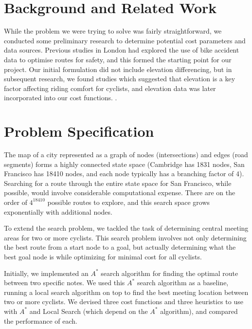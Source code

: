 \documentclass[11pt]{article}
\begin{document}


\section{Background and Related Work}

While the problem we were trying to solve was fairly straightforward, we conducted some preliminary research to determine potential cost parameters and data sources. Previous studies in London had explored the use of bike accident data to optimise routes for safety, and this formed the starting point for our project. Our initial formulation did not include elevation differencing, but in subsequent research, we found studies which suggested that elevation is a key factor affecting riding comfort for cyclists, and elevation data was later incorporated into our cost functions.   \cite{pmbr}.

\section{Problem Specification}
The map of a city represented as a graph of nodes (intersections) and edges (road segments) forms a highly connected state space (Cambridge has 1831 nodes, San Francisco has 18410 nodes, and each node typically has a branching factor of 4). Searching for a route through the entire state space for San Francisco, while possible, would involve considerable computational expense. There are on the order of $4^{18410}$ possible routes to explore, and this search space grows exponentially with additional nodes.
\par To extend the search problem, we tackled the task of determining central meeting areas for two or more cyclists. This search problem involves not only determining the best route from a start node to a goal, but actually determining what the best goal node is while optimizing for minimal cost for all cyclists.
\par Initially, we implemented an $A^{*}$ search algorithm for finding the optimal route between two specific notes. We used this $A^{*}$ search algorithm as a baseline, running a local search algorithm on top to find the best meeting location between two or more cyclists. We devised three cost functions and three heuristics to use with $A^{*}$ and Local Search (which depend on the $A^{*}$ algorithm), and compared the performance of each.
\end{document}
